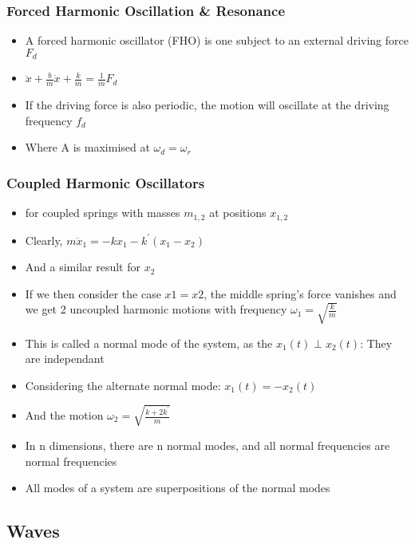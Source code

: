 \documentclass{article}
\begin{document}
\subsubsection*{Forced Harmonic Oscillation \& Resonance}

\begin{itemize}
    \item A forced harmonic oscillator (FHO) is one subject to an external driving force \(F_d\)
    \item \(\ddot x + \frac{b}{m}\dot x + \frac{k}{m}=\frac{1}{m}F_d\)
    \item If the driving force is also periodic, the motion will oscillate at the driving frequency \(f_d\)
    \item Where A is maximised at \(\omega_d=\omega_r\)
\end{itemize}

\subsubsection*{Coupled Harmonic Oscillators}
\begin{itemize}
    \item for coupled springs with masses \(m_{1,2}\) at positions \(x_{1,2}\)
    \item Clearly, \(m\ddot x_1 =-kx_1 -k^{\prime}(x_1-x_2)\)
    \item And a similar result for \(x_2\)
    \item If we then consider the case \(x1=x2\), the middle spring's force vanishes and we get 2 uncoupled harmonic motions with frequency \(\omega_1=\sqrt{\frac{k}{m}}\)
    \item This is called a normal mode of the system, as the \(x_1(t)\perp x_2(t)\): They are independant  
    \item Considering the alternate normal mode: \(x_1(t)=-x_2(t)\)
    \item And the motion \(\omega_2=\sqrt{\frac{k+2k^{\prime}}{m}}\)
    \item In n dimensions, there are n normal modes, and all normal frequencies are normal frequencies
    \item All modes of a system are superpositions of the normal modes
\end{itemize}

\newpage
\subsection*{Waves}
\end{document}
